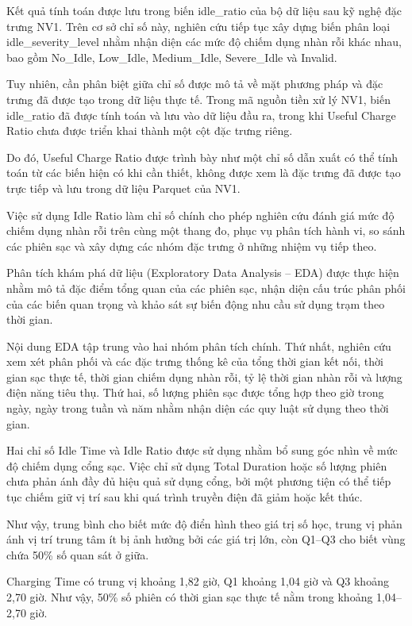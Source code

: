 \documentclass[conference,a4paper]{IEEEtran}
\begin{document}
Kết quả tính toán được lưu trong biến idle\_ratio của bộ dữ liệu sau kỹ nghệ đặc trưng NV1. Trên cơ sở chỉ số này, nghiên cứu tiếp tục xây dựng biến phân loại idle\_severity\_level nhằm nhận diện các mức độ chiếm dụng nhàn rỗi khác nhau, bao gồm No\_Idle, Low\_Idle, Medium\_Idle, Severe\_Idle và Invalid.

Tuy nhiên, cần phân biệt giữa chỉ số được mô tả về mặt phương pháp và đặc trưng đã được tạo trong dữ liệu thực tế. Trong mã nguồn tiền xử lý NV1, biến idle\_ratio đã được tính toán và lưu vào dữ liệu đầu ra, trong khi Useful Charge Ratio chưa được triển khai thành một cột đặc trưng riêng.

Do đó, Useful Charge Ratio được trình bày như một chỉ số dẫn xuất có thể tính toán từ các biến hiện có khi cần thiết, không được xem là đặc trưng đã được tạo trực tiếp và lưu trong dữ liệu Parquet của NV1.

Việc sử dụng Idle Ratio làm chỉ số chính cho phép nghiên cứu đánh giá mức độ chiếm dụng nhàn rỗi trên cùng một thang đo, phục vụ phân tích hành vi, so sánh các phiên sạc và xây dựng các nhóm đặc trưng ở những nhiệm vụ tiếp theo.

Phân tích khám phá dữ liệu (Exploratory Data Analysis – EDA) được thực hiện nhằm mô tả đặc điểm tổng quan của các phiên sạc, nhận diện cấu trúc phân phối của các biến quan trọng và khảo sát sự biến động nhu cầu sử dụng trạm theo thời gian.

Nội dung EDA tập trung vào hai nhóm phân tích chính. Thứ nhất, nghiên cứu xem xét phân phối và các đặc trưng thống kê của tổng thời gian kết nối, thời gian sạc thực tế, thời gian chiếm dụng nhàn rỗi, tỷ lệ thời gian nhàn rỗi và lượng điện năng tiêu thụ. Thứ hai, số lượng phiên sạc được tổng hợp theo giờ trong ngày, ngày trong tuần và năm nhằm nhận diện các quy luật sử dụng theo thời gian.

Hai chỉ số Idle Time và Idle Ratio được sử dụng nhằm bổ sung góc nhìn về mức độ chiếm dụng cổng sạc. Việc chỉ sử dụng Total Duration hoặc số lượng phiên chưa phản ánh đầy đủ hiệu quả sử dụng cổng, bởi một phương tiện có thể tiếp tục chiếm giữ vị trí sau khi quá trình truyền điện đã giảm hoặc kết thúc.

Như vậy, trung bình cho biết mức độ điển hình theo giá trị số học, trung vị phản ánh vị trí trung tâm ít bị ảnh hưởng bởi các giá trị lớn, còn Q1–Q3 cho biết vùng chứa 50\% số quan sát ở giữa.

Charging Time có trung vị khoảng 1,82 giờ, Q1 khoảng 1,04 giờ và Q3 khoảng 2,70 giờ. Như vậy, 50\% số phiên có thời gian sạc thực tế nằm trong khoảng 1,04–2,70 giờ.
\end{document}
